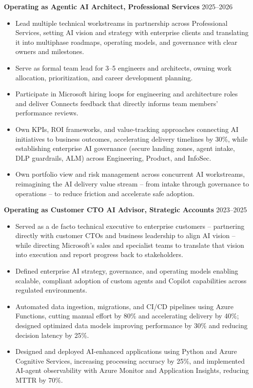\documentclass[margin]{res}
\begin{document}
\begin{resume}
\textbf{Operating as Agentic AI Architect, Professional Services} \hfill 2025--2026\\
\begin{itemize}
\item Lead multiple technical workstreams in partnership across Professional Services, setting AI vision and strategy with enterprise clients and translating it into multiphase roadmaps, operating models, and governance with clear owners and milestones.
\item Serve as formal team lead for 3--5 engineers and architects, owning work allocation, prioritization, and career development planning.
\item Participate in Microsoft hiring loops for engineering and architecture roles and deliver Connects feedback that directly informs team members' performance reviews.
\item Own KPIs, ROI frameworks, and value-tracking approaches connecting AI initiatives to business outcomes, accelerating delivery timelines by 30\%, while establishing enterprise AI governance (secure landing zones, agent intake, DLP guardrails, ALM) across Engineering, Product, and InfoSec.
\item Own portfolio view and risk management across concurrent AI workstreams, reimagining the AI delivery value stream -- from intake through governance to operations -- to reduce friction and accelerate safe adoption.
\end{itemize}

\textbf{Operating as Customer CTO AI Advisor, Strategic Accounts} \hfill 2023--2025\\
\begin{itemize}
\item Served as a de facto technical executive to enterprise customers -- partnering directly with customer CTOs and business leadership to align AI vision -- while directing Microsoft's sales and specialist teams to translate that vision into execution and report progress back to stakeholders.
\item Defined enterprise AI strategy, governance, and operating models enabling scalable, compliant adoption of custom agents and Copilot capabilities across regulated environments.
\item Automated data ingestion, migrations, and CI/CD pipelines using Azure Functions, cutting manual effort by 80\% and accelerating delivery by 40\%; designed optimized data models improving performance by 30\% and reducing decision latency by 25\%.
\item Designed and deployed AI-enhanced applications using Python and Azure Cognitive Services, increasing processing accuracy by 25\%, and implemented AI-agent observability with Azure Monitor and Application Insights, reducing MTTR by 70\%.
\end{itemize}


\end{resume}
\end{document}
